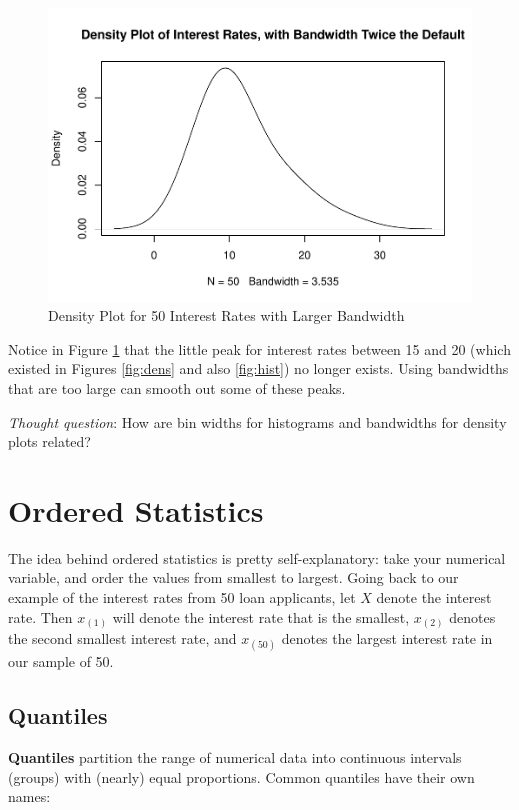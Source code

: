 \documentclass[
]{book}
\begin{document}
\begin{figure}
\centering
\includegraphics{bookdown-demo_files/figure-latex/dens2-1.pdf}
\caption{\label{fig:dens2}Density Plot for 50 Interest Rates with Larger Bandwidth}
\end{figure}

Notice in Figure \ref{fig:dens2} that the little peak for interest rates between 15 and 20 (which existed in Figures \ref{fig:dens} and also \ref{fig:hist}) no longer exists. Using bandwidths that are too large can smooth out some of these peaks.

\emph{Thought question}: How are bin widths for histograms and bandwidths for density plots related?

\section{Ordered Statistics}\label{ordered-statistics}

The idea behind ordered statistics is pretty self-explanatory: take your numerical variable, and order the values from smallest to largest. Going back to our example of the interest rates from 50 loan applicants, let \(X\) denote the interest rate. Then \(x_{(1)}\) will denote the interest rate that is the smallest, \(x_{(2)}\) denotes the second smallest interest rate, and \(x_{(50)}\) denotes the largest interest rate in our sample of 50.

\subsection{Quantiles}\label{quantiles}

\textbf{Quantiles} partition the range of numerical data into continuous intervals (groups) with (nearly) equal proportions. Common quantiles have their own names:
\end{document}
